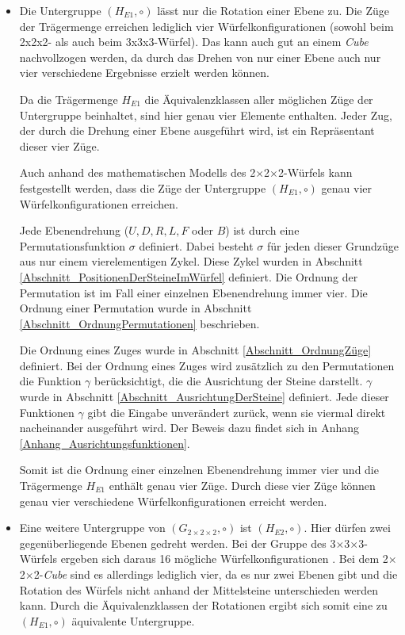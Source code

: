 \documentclass[12pt,a4paper, usenames, dvipsnames]{article}
\theoremstyle{mystyle}
\theoremstyle{definition}
\newcommand{\Gtwo}{\ensuremath{G_{2\times 2\times 2}}}
\newcommand{\Ttwo}{2$\times$2$\times$2-}
\newcommand{\Tthree}{3$\times$3$\times$3-}
\begin{document}
\begin{itemize}
\item Die Untergruppe $(H_{E1}, \circ)$ lässt nur die Rotation einer Ebene zu. Die Züge der Trägermenge erreichen lediglich vier Würfelkonfigurationen (sowohl beim 2x2x2- als auch beim 3x3x3-Würfel). Das kann auch gut an einem \textit{Cube} nachvollzogen werden, da durch das Drehen von nur einer Ebene auch nur vier verschiedene Ergebnisse erzielt werden können.

Da die Trägermenge $H_{E1}$ die Äquivalenzklassen aller möglichen Züge der Untergruppe beinhaltet, sind hier genau vier Elemente enthalten. Jeder Zug, der durch die Drehung einer Ebene ausgeführt wird, ist ein Repräsentant dieser vier Züge.

Auch anhand des mathematischen Modells des \Ttwo Würfels kann festgestellt werden, dass die Züge der Untergruppe $(H_{E1}, \circ)$ genau vier Würfelkonfigurationen erreichen.

Jede Ebenendrehung ($U, D, R, L, F$ oder $B$) ist durch eine Permutationsfunktion $\sigma$ definiert. Dabei besteht $\sigma$ für jeden dieser Grundzüge aus nur einem vierelementigen Zykel. Diese Zykel wurden in Abschnitt \ref{Abschnitt_PositionenDerSteineImWürfel} definiert. Die Ordnung der Permutation ist im Fall einer einzelnen Ebenendrehung immer vier. Die Ordnung einer Permutation wurde in Abschnitt \ref{Abschnitt_OrdnungPermutationen} beschrieben.

Die Ordnung eines Zuges wurde in Abschnitt \ref{Abschnitt_OrdnungZüge} definiert. Bei der Ordnung eines Zuges wird zusätzlich zu den Permutationen die Funktion $\gamma$ berücksichtigt, die die Ausrichtung der Steine darstellt. $\gamma$ wurde in Abschnitt \ref{Abschnitt_AusrichtungDerSteine} definiert. Jede dieser Funktionen $\gamma$ gibt die Eingabe unverändert zurück, wenn sie viermal direkt nacheinander ausgeführt wird. Der Beweis dazu findet sich in Anhang \ref{Anhang_Ausrichtungsfunktionen}. 

Somit ist die Ordnung einer einzelnen Ebenendrehung immer vier und die Trägermenge $H_{E1}$ enthält genau vier Züge. Durch diese vier Züge können genau vier verschiedene Würfelkonfigurationen erreicht werden. 



\item Eine weitere Untergruppe von $(\Gtwo, \circ)$ ist $(H_{E2}, \circ)$. Hier dürfen zwei gegenüber\-liegende Ebenen gedreht werden. 
Bei der Gruppe des \Tthree Würfels ergeben sich daraus 16 mögliche Würfelkonfigurationen \cite{TD}. Bei dem \Ttwo \textit{Cube} sind es allerdings lediglich vier, da es nur zwei Ebenen gibt und die Rotation des Würfels nicht anhand der Mittelsteine unterschieden werden kann. Durch die Äquivalenzklassen der Rotationen ergibt sich somit eine zu $(H_{E1}, \circ)$ äquivalente Untergruppe.
\end{itemize}
\end{document}
